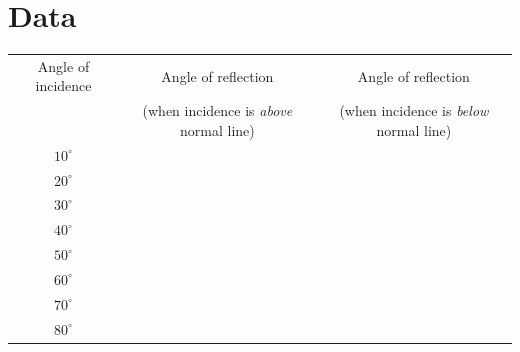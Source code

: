 \documentclass[10pt]{exam}
\begin{document}
\section*{Data} \hfill

\vspace{1em}

\renewcommand{\arraystretch}{1.6}

\begin{tabular}{|c|c|c|}
  \hline
  Angle of incidence &
  Angle of reflection &
  Angle of reflection \\
  &
  (when incidence is \emph{above} normal line) &
  (when incidence is \emph{below} normal line) \\\hline
  $10^\circ$ && \\\hline
  $20^\circ$ && \\\hline
  $30^\circ$ && \\\hline
  $40^\circ$ && \\\hline
  $50^\circ$ && \\\hline
  $60^\circ$ && \\\hline
  $70^\circ$ && \\\hline
  $80^\circ$ && \\\hline
\end{tabular}
\end{document}

